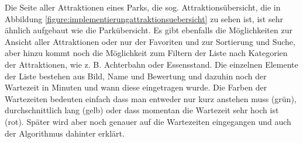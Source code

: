 Die Seite aller Attraktionen eines Parks, die sog. Attraktionsübersicht, die in Abbildung \ref{figure:implementierungattraktionsuebersicht} zu sehen ist, ist sehr ähnlich aufgebaut wie die Parkübersicht. Es gibt ebenfalls die Möglichkeiten zur Ansicht aller Attraktionen oder nur der Favoriten und zur Sortierung und Suche, aber hinzu kommt noch die Möglichkeit zum Filtern der Liste nach Kategorien der Attraktionen, wie z. B. Achterbahn oder Essensstand. Die einzelnen Elemente der Liste bestehen aus Bild, Name und Bewertung und dazuhin noch der Wartezeit in Minuten und wann diese eingetragen wurde. Die Farben der Wartezeiten bedeuten einfach dass man entweder nur kurz anstehen muss (grün), durchschnittlich lang (gelb) oder dass momentan die Wartezeit sehr hoch ist (rot). Später wird aber noch genauer auf die Wartezeiten eingegangen und auch der Algorithmus dahinter erklärt. 

